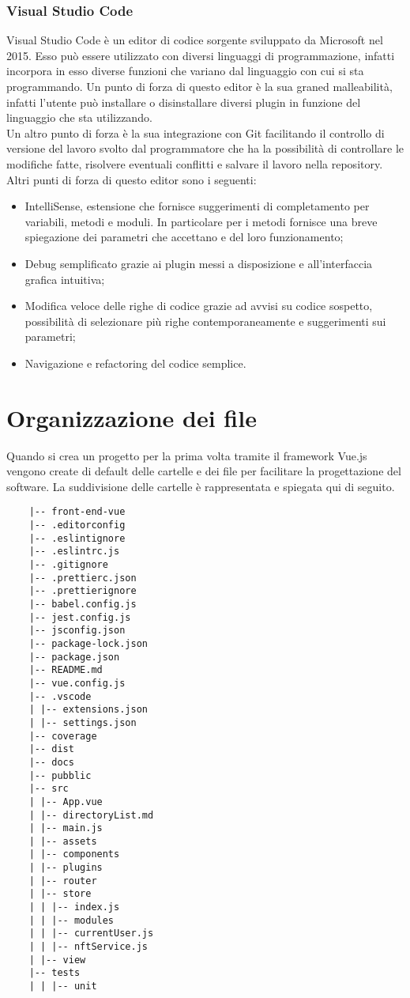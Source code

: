 \subsubsection{Visual Studio Code}

Visual Studio Code è un editor di codice sorgente sviluppato da Microsoft nel 2015. Esso può essere utilizzato con diversi linguaggi di programmazione, infatti incorpora in esso diverse funzioni che variano dal linguaggio con cui si sta programmando. Un punto di forza di questo editor è la sua graned malleabilità, infatti l'utente può installare o disinstallare diversi plugin in funzione del linguaggio che sta utilizzando.\\
Un altro punto di forza è la sua integrazione con Git facilitando il controllo di versione del lavoro svolto dal programmatore che ha la possibilità di controllare le modifiche fatte, risolvere eventuali conflitti e salvare il lavoro nella repository. Altri punti di forza di questo editor sono i seguenti:
\begin{itemize}
	\item IntelliSense, estensione che fornisce suggerimenti di completamento per variabili, metodi e moduli. In particolare per i metodi fornisce una breve spiegazione dei parametri che accettano e del loro funzionamento;
	\item Debug semplificato grazie ai plugin messi a disposizione e all'interfaccia grafica intuitiva;
	\item Modifica veloce delle righe di codice grazie ad avvisi su codice sospetto, possibilità di selezionare più righe contemporaneamente e suggerimenti sui parametri;
	\item Navigazione e refactoring del codice semplice.
\end{itemize}

\section{Organizzazione dei file}
Quando si crea un progetto per la prima volta tramite il framework Vue.js vengono create di default delle cartelle e dei file per facilitare la progettazione del software. La suddivisione delle cartelle è rappresentata e spiegata qui di seguito.

\begin{lstlisting}
	|-- front-end-vue
	|-- .editorconfig
	|-- .eslintignore
	|-- .eslintrc.js
	|-- .gitignore
	|-- .prettierc.json
	|-- .prettierignore
	|-- babel.config.js
	|-- jest.config.js
	|-- jsconfig.json
	|-- package-lock.json
	|-- package.json
	|-- README.md
	|-- vue.config.js
	|-- .vscode
	| |-- extensions.json
	| |-- settings.json
	|-- coverage
	|-- dist
	|-- docs
	|-- pubblic
	|-- src
	| |-- App.vue
	| |-- directoryList.md
	| |-- main.js
	| |-- assets
	| |-- components
	| |-- plugins
	| |-- router
	| |-- store
	| | |-- index.js
	| | |-- modules
	| | |-- currentUser.js
	| | |-- nftService.js
	| |-- view
	|-- tests
	| | |-- unit
\end{lstlisting}

